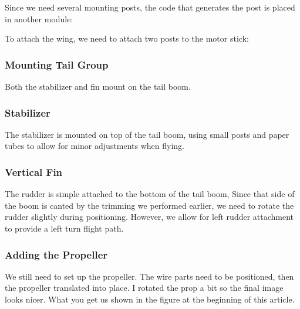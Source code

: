 Since we need several mounting posts, the code that generates the post is
placed in another module:

To attach the wing, we need to attach two posts to the motor stick:


\subsubsection{Mounting Tail Group}

Both the stabilizer and fin mount on the tail boom.

\subsubsection{Stabilizer}

The stabilizer is mounted on top of the tail boom, using small posts and paper
tubes to allow for minor adjustments when flying.

\subsubsection{Vertical Fin}

The rudder is simple attached to the bottom of the tail boom, Since that side
of the boom is canted by the trimming we performed earlier, we need to rotate
the rudder slightly during positioning.  However, we allow for  left rudder
attachment to provide a left turn flight path.

\subsubsection{Adding the Propeller}

We still need to set up the propeller. The wire parts need to be positioned,
then the propeller translated into place. I rotated the prop a bit so the final
image looks nicer. What you get us shown in the figure at the beginning of this
article.



